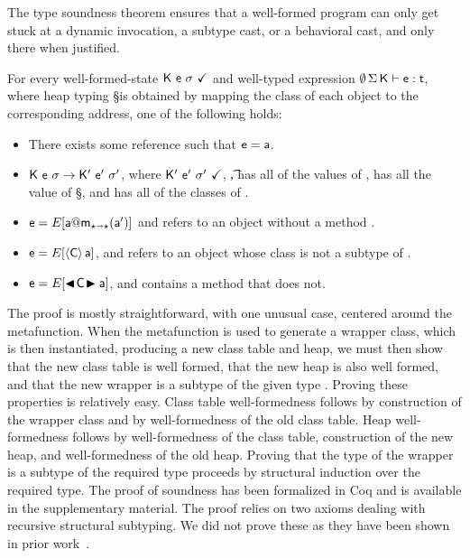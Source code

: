 \documentclass[USenglish]{tex/lipics-v2016}
\begin{document}
The \kafka type soundness theorem ensures that a well-formed program can
only get stuck at a dynamic invocation, a subtype cast, or a behavioral
cast, and only there when justified.

\begin{theorem}

\noindent For every well-formed-state $\WFq{\K~\e~\s}$ and well-typed
expression $\EnvType\emptyset\S\K\e\t$, where heap typing \S is obtained by
mapping the class of each object to the corresponding address, one of the
following holds:

\newcommand{\Sp}{\EM{\S'}\xspace}

\begin{itemize}
\item There exists some reference \a such that $\e = \a$.
\item $\K~\e~\s\Red\Kp~\ep~\sp$, where $\WFq{\Kp~\ep~\sp}$,
  \EnvType\emptyset\Sp\Kp\ep\t, \sp has all of the values of \s, \Sp has all
  the value of \S, and \Kp has all of the classes of \K.
\item $\e=E[\DynCall\a\m\ap]$ and \a refers to an object without a method \m.
\item $\e=E[\SubCast\C\a]$, and \a refers to an object whose class is not
  a subtype of \C.
\item $\e=E[\BehCast\C\a]$, and \C contains a method that \a does not.
\end{itemize}
\end{theorem}

\noindent
The proof is mostly straightforward, with one unusual case, centered around
the  metafunction. When the  metafunction is used to
generate a wrapper class, which is then instantiated, producing a new class
table and heap, we must then show that the new class table is well formed,
that the new heap is also well formed, and that the new wrapper is a subtype
of the given type \C.  Proving these properties is relatively easy.  Class
table well-formedness follows by construction of the wrapper class and by
well-formedness of the old class table. Heap well-formedness follows by
well-formedness of the class table, construction of the new heap, and
well-formedness of the old heap.  Proving that the type of the wrapper is a
subtype of the required type proceeds by structural induction over the
required type.  The proof of soundness has been formalized in Coq and is
available in the supplementary material. The proof relies on two axioms
dealing with recursive structural subtyping. We did not prove these as
they have been shown in prior work~\cite{JonesStructural}.
\end{document}
